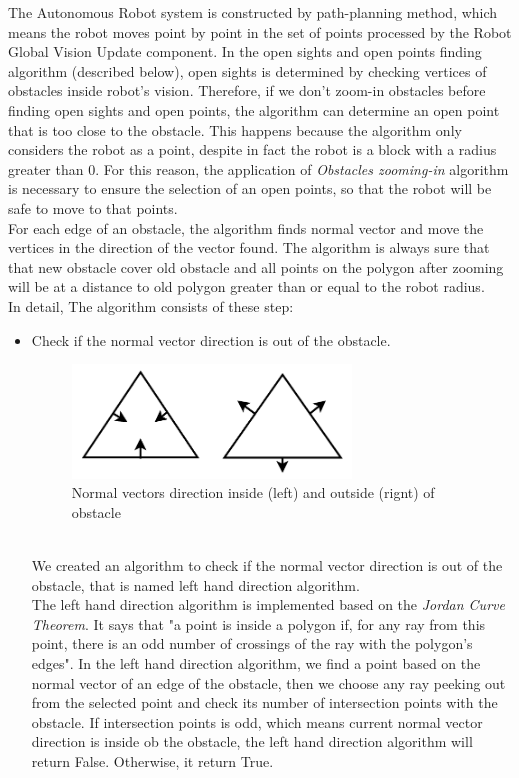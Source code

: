 \documentclass[13pt,a4paper]{article}
\begin{document}
\begin{itemize}
				The Autonomous Robot system is constructed by path-planning method, which means the robot moves point by point in the set of points processed by the Robot Global Vision Update component. In the open sights and open points finding algorithm (described below), open sights is determined by checking vertices of obstacles inside robot's vision. Therefore, if we don't zoom-in obstacles before finding open sights and open points, the algorithm can determine an open point that is too close to the obstacle. This happens because the algorithm only considers the robot as a point, despite in fact the robot is a block with a radius greater than 0. For this reason, the application of \textit{Obstacles zooming-in} algorithm is necessary to ensure the selection of an open points, so that the robot will be safe to move to that points.\\
				For each edge of an obstacle, the algorithm finds normal vector and move the vertices in the direction of the vector found. The algorithm is always sure that that new obstacle cover old obstacle and all points on the polygon after zooming will be at a distance to old polygon greater than or equal to the robot radius. \\
				In detail, The algorithm consists of these step:
				\begin{itemize}
					\item Check if the normal vector direction is out of the obstacle.
					\begin{figure}[!h]
						\centering                                 \includegraphics[width=0.7\textwidth]{Robot_Global_Vision_Update/RGVU_fconfig_lefthand.png}
						\caption{Normal vectors direction inside (left) and outside (rignt) of obstacle}
					\end{figure} \\
					We created an algorithm to check if the normal vector direction is out of the obstacle, that is named left hand direction algorithm. \\
					The left hand direction algorithm is implemented based on the \textit{Jordan Curve Theorem}. It says that "a point is inside a polygon if, for any ray from this point, there is an odd number of crossings of the ray with the polygon's edges". In the left hand direction algorithm, we find a point based on the normal vector of an edge of the obstacle, then we choose any ray peeking out from the selected point and check its number of intersection points with the obstacle. If intersection points is odd, which means current normal vector direction is inside ob the obstacle, the left hand direction algorithm will return False. Otherwise, it return True.\\

\end{itemize}
\end{itemize}
\end{document}
